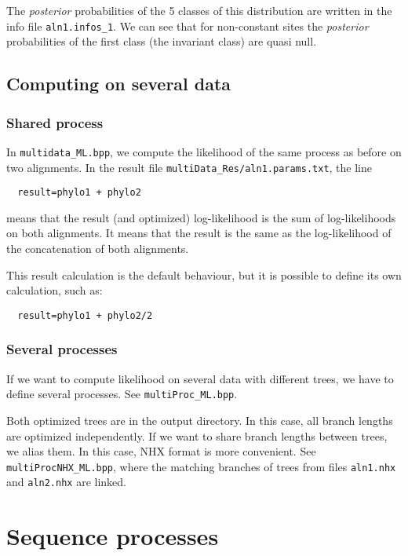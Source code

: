 \documentclass{article}
\begin{document}
The \textit{posterior} probabilities of the 5 classes of this
distribution are written in the info file \verb|aln1.infos_1|. We can
see that for non-constant sites the \textit{posterior}
probabilities of the first class (the invariant class) are quasi null.

\subsection{Computing on several data}

\subsubsection{Shared process}

In \verb#multidata_ML.bpp#, we compute the likelihood of the same
process as before on two alignments. 
In the result file \verb#multiData_Res/aln1.params.txt#, the line

\begin{verbatim}
  result=phylo1 + phylo2
\end{verbatim}

means that the result (and optimized) log-likelihood is the sum of
log-likelihoods on both alignments. It means that the result is the
same as the log-likelihood of the concatenation of both alignments.

This result calculation is the default behaviour, but it is possible
to define its own calculation, such as: 

\begin{verbatim}
  result=phylo1 + phylo2/2
\end{verbatim}

\subsubsection{Several processes}

If we want to compute likelihood on several data with different trees,
we have to define several processes. See \verb#multiProc_ML.bpp#.

Both optimized trees are in the output directory. In this case, all
branch lengths are optimized independently. If we want to share branch
lengths between trees, we alias them. In this case, NHX format is more
convenient. See \verb#multiProcNHX_ML.bpp#, where the matching
branches of trees from files \verb#aln1.nhx# and \verb#aln2.nhx# are
linked. 

\section{Sequence processes}
\end{document}
